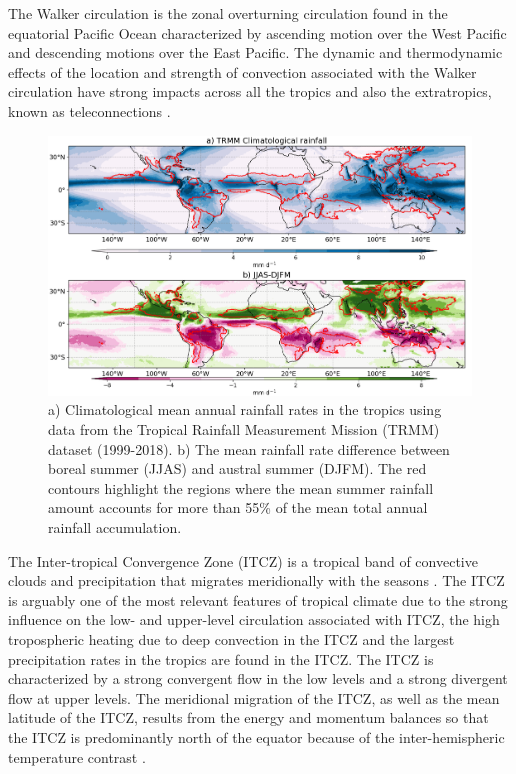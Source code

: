 The Walker circulation is the zonal overturning circulation found in the equatorial Pacific Ocean characterized by ascending motion over the West Pacific and descending motions over the East Pacific\citep{walker1924,bjerknes1969,gill1980}. The dynamic and thermodynamic effects of the location and strength of convection associated with the Walker circulation have strong impacts across all the tropics and also the extratropics, known as teleconnections \citep{cai2019pantropical}.


\begin{figure}[b!]
\includegraphics[width=\linewidth]{figures/trmmclima.png}
\caption{a) Climatological mean annual rainfall rates in the tropics using data from the Tropical Rainfall Measurement Mission (TRMM) dataset (1999-2018). b) The mean rainfall rate difference between boreal summer (JJAS) and austral summer (DJFM). The red contours highlight the regions where the mean summer rainfall amount accounts for more than 55\% of the mean total annual rainfall accumulation. }
\label{fig:monsoon}
\end{figure}

The Inter-tropical Convergence Zone (ITCZ) is a tropical band of convective clouds and precipitation that migrates meridionally with the seasons \citep{schneider2014}. The ITCZ is arguably one of the most relevant features of tropical climate due to the strong influence on the low- and upper-level circulation associated with ITCZ, the high tropospheric heating due to deep convection in the ITCZ and the largest precipitation rates in the tropics are found in the ITCZ.
The ITCZ is characterized by a strong convergent flow in the low levels and a strong divergent flow at upper levels. 
The meridional migration of the ITCZ, as well as the mean latitude of the ITCZ, results from the energy and momentum balances so that the ITCZ is predominantly north of the equator because of the inter-hemispheric temperature contrast \citep{donohoe2013,bischoff2016}.

